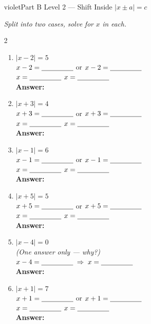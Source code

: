 \documentclass[12pt]{article}
\newcommand{\wsp}{\vspace{2.6cm}}
\newcommand{\blank}{\underline{\hspace{2.8cm}}}
\newcommand{\sblank}{\underline{\hspace{1.6cm}}}
\begin{document}
\vspace{12pt}

\begin{partbox}{violet}{Part B \quad Level 2 --- Shift Inside
  \hfill{\normalfont\small $|x \pm a| = c$}}

\textit{Split into two cases, solve for $x$ in each.}
\vspace{8pt}
\begin{multicols}{2}
\begin{enumerate}[label=\textbf{\arabic*.}, itemsep=0pt]

  \item $|x - 2| = 5$\\[3pt]
  $x - 2 = \sblank$ or $x - 2 = \sblank$\\[3pt]
  $x = \sblank$ \hspace{0.9cm} $x = \sblank$\\[3pt]
  \textbf{Answer:} \blank
  \wsp

  \item $|x + 3| = 4$\\[3pt]
  $x + 3 = \sblank$ or $x + 3 = \sblank$\\[3pt]
  $x = \sblank$ \hspace{0.9cm} $x = \sblank$\\[3pt]
  \textbf{Answer:} \blank
  \wsp

  \item $|x - 1| = 6$\\[3pt]
  $x - 1 = \sblank$ or $x - 1 = \sblank$\\[3pt]
  $x = \sblank$ \hspace{0.9cm} $x = \sblank$\\[3pt]
  \textbf{Answer:} \blank
  \wsp

  \item $|x + 5| = 5$\\[3pt]
  $x + 5 = \sblank$ or $x + 5 = \sblank$\\[3pt]
  $x = \sblank$ \hspace{0.9cm} $x = \sblank$\\[3pt]
  \textbf{Answer:} \blank
  \wsp

  \item $|x - 4| = 0$\\[3pt]
  \textit{(One answer only --- why?)}\\[3pt]
  $x - 4 = \sblank \;\Rightarrow\; x = \sblank$\\[3pt]
  \textbf{Answer:} \blank
  \wsp

  \item $|x + 1| = 7$\\[3pt]
  $x + 1 = \sblank$ or $x + 1 = \sblank$\\[3pt]
  $x = \sblank$ \hspace{0.9cm} $x = \sblank$\\[3pt]
  \textbf{Answer:} \blank
  \wsp

\end{enumerate}
\end{multicols}
\end{partbox}
\end{document}
